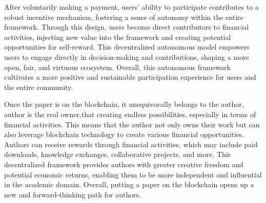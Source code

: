 \documentclass[lettersize,journal]{IEEEtran}
\begin{document}
After voluntarily making a payment, users' ability to participate contributes to a robust incentive mechanism, fostering a sense of autonomy within the entire framework. Through this design, users become direct contributors to financial activities, injecting new value into the framework and creating potential opportunities for self-reward. This decentralized autonomous model empowers users to engage directly in decision-making and contributions, shaping a more open, fair, and virtuous ecosystem. Overall, this autonomous framework cultivates a more positive and sustainable participation experience for users and the entire community.

Once the paper is on the blockchain, it unequivocally belongs to the author, author is the real owner,that creating endless possibilities, especially in terms of financial activities. This means that the author not only owns their work but can also leverage blockchain technology to create various financial opportunities. Authors can receive rewards through financial activities, which may include paid downloads, knowledge exchanges, collaborative projects, and more. This decentralized framework provides authors with greater creative freedom and potential economic returns, enabling them to be more independent and influential in the academic domain. Overall, putting a paper on the blockchain opens up a new and forward-thinking path for authors.
\end{document}
